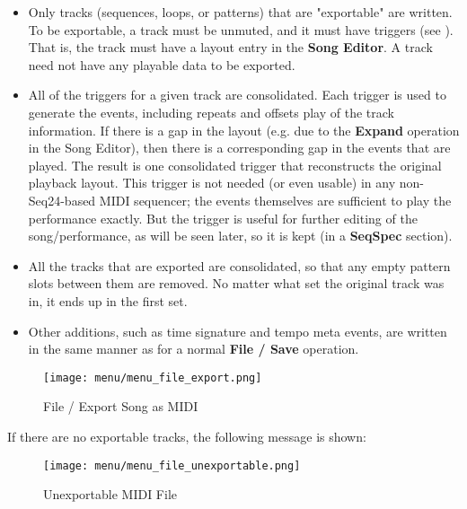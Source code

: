    \begin{itemize}
      \item Only tracks (sequences, loops, or patterns)
         that are "exportable" are written.  To be exportable, a
         track must be unmuted, and it must have triggers (see
         ).  That is,
         the track must have a layout entry in the \textbf{Song Editor}.
         A track need not have any playable data to be exported.
      \item All of the triggers for a given track are consolidated.  Each
         trigger is used to generate the events, including repeats and offsets
         play of the track information.  If there is a gap in the layout (e.g.
         due to the \textbf{Expand} operation in the Song Editor), then there
         is a corresponding gap in the events that are played. The result is
         one consolidated trigger that reconstructs the original playback
         layout.  This trigger is not needed (or even usable) in any
         non-Seq24-based MIDI sequencer; the events themselves are sufficient
         to play the performance exactly.  But the trigger is useful for
         further editing of the song/performance, as will be seen later,
         so it is kept (in a \textbf{SeqSpec} section).
      \item All the tracks that are exported are consolidated, so that any
         empty pattern slots between them are removed.  No matter what set the
         original track was in, it ends up in the first set.
      \item Other additions, such as time signature and tempo meta events, are
         written in the same manner as for a normal \textbf{File / Save}
         operation.
   \end{itemize}

\begin{figure}[H]
   \centering 
   \texttt{[image: menu/menu\_file\_export.png]}
   \caption{File / Export Song as MIDI}
   \label{fig:seq64_menu_file_export}
\end{figure}

   If there are no exportable tracks, the following message is shown:

\begin{figure}[H]
   \centering 
   \texttt{[image: menu/menu\_file\_unexportable.png]}
   \caption{Unexportable MIDI File}
   \label{fig:seq64_menu_file_unexportable}
\end{figure}

